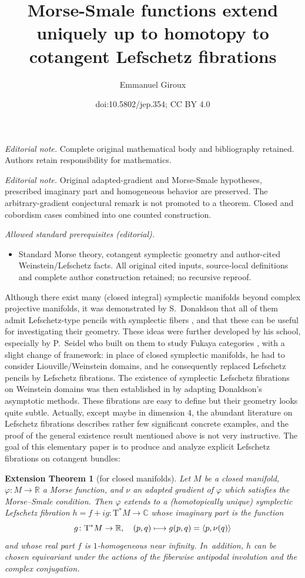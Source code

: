 \documentclass[10pt]{amsart}
\title{Morse-Smale functions extend uniquely up to homotopy to cotangent Lefschetz fibrations}
\author{Emmanuel Giroux}
\date{doi:10.5802/jep.354; CC BY 4.0}
\newcommand\mto{\mathchoice{\longmapsto}{\mapsto}{\mapsto}{\mapsto}}
\newcommand{\C}{{\mathbb C}}
\newcommand{\R}{{\mathbb R}}
\newcommand{\tu}[1]{\textup{#1}}
\newcommand{\sT}{\mathrm{T}^\ast}
\newcommand{\prg}[1]{\langle #1 \rangle}
\let\on\colon
\theoremstyle{plain}
\newtheorem{extension-theorem}[theorem]{Extension Theorem}
\theoremstyle{definition}
\begin{document}
\maketitle
\noindent\textit{Editorial note.} Complete original mathematical body and bibliography retained. Authors retain responsibility for mathematics.\par\medskip
\noindent\textit{Editorial note.} Original adapted-gradient and Morse-Smale hypotheses, prescribed imaginary part and homogeneous behavior are preserved. The arbitrary-gradient conjectural remark is not promoted to a theorem. Closed and cobordism cases combined into one counted construction.\par\medskip
\noindent\textit{Allowed standard prerequisites (editorial).}\begin{itemize}
\item Standard Morse theory, cotangent symplectic geometry and author-cited Weinstein/Lefschetz facts. All original cited inputs, source-local definitions and complete author construction retained; no recursive reproof.
\end{itemize}\medskip
Although there exist many (closed integral) symplectic manifolds beyond complex
projective manifolds, it was demonstrated by S.~Donaldson that all of them admit
Lefschetz-type pencils with symplectic fibers \cite{Do}, and that these can be
useful for investigating their geometry. These ideas were further developed by
his school, especially by P.~Seidel who built on them to study Fukaya categories
\cite{Se}, with a slight change of framework: in place of closed symplectic
manifolds, he had to consider Liouville/Weinstein domains, and he consequently
replaced Lefschetz pencils by Lefschetz fibrations. The existence of symplectic
Lefschetz fibrations on Weinstein domains was then established in \cite{GP} by
adapting Donaldson's asymptotic methods. These fibrations are easy to define but
their geometry looks quite subtle. Actually, except maybe in dimension $4$, the
abundant literature on Lefschetz fibrations describes rather few significant
concrete examples, and the proof of the general existence result mentioned above
is not very instructive. The goal of this elementary paper is to produce and
analyze explicit Lefschetz fibrations on cotangent bundles:


\begin{extension-theorem}[for closed manifolds] \label{t:closed}
Let $M$ be a closed manifold, \hbox{$\varphi \on M \!\to\! \R$} a Morse function, and $\nu$
an adapted gradient of $\varphi$ which satisfies the Morse--Smale condition.
Then $\varphi$ extends to a \tu(homotopically unique\tu) symplectic Lefschetz
fibration $h = f+ig \on \sT M \to \C$ whose imaginary part is the function
\[
g \on \sT M \to \R, \quad (p,q) \mto g(p,q) = \prg{p, \nu(q)}
\]
and whose real part $f$ is $1$-homogeneous near infinity. In~addition, $h$ can
be chosen equivariant under the actions of the fiberwise antipodal involution
and the complex conjugation.
\end{extension-theorem}
\end{document}
